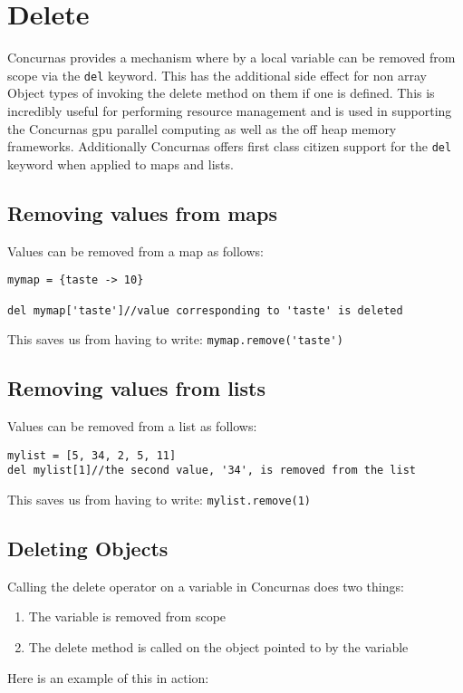 \documentclass[conc-doc]{subfiles}
\begin{document}
	
	\chapter[Delete]{Delete}
	
Concurnas provides a mechanism where by a local variable can be removed from scope via the \lstinline{del} keyword. This has the additional side effect for non array Object types of invoking the delete method on them if one is defined. This is incredibly useful for performing resource management and is used in supporting the Concurnas gpu parallel computing as well as the off heap memory frameworks. Additionally Concurnas offers first class citizen support for the \lstinline{del} keyword when applied to maps and lists.

\section{Removing values from maps}
Values can be removed from a map as follows:
\begin{lstlisting}
mymap = {taste -> 10}

del mymap['taste']//value corresponding to 'taste' is deleted
\end{lstlisting}
This saves us from having to write: \lstinline{mymap.remove('taste')}

\section{Removing values from lists}
Values can be removed from a list as follows:

\begin{lstlisting}
mylist = [5, 34, 2, 5, 11]
del mylist[1]//the second value, '34', is removed from the list
\end{lstlisting}
This saves us from having to write: \lstinline{mylist.remove(1)}


\section{Deleting Objects}
Calling the delete operator on a variable in Concurnas does two things:
\begin{enumerate}
	\item The variable is removed from scope
	\item The delete method is called on the object pointed to by the variable
\end{enumerate}

Here is an example of this in action:
\end{document}
